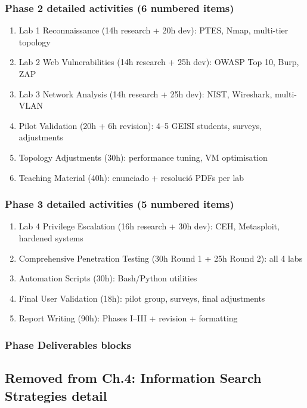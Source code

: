 \documentclass[a4paper,11pt]{article}
\begin{document}
\subsubsection{Phase 2 detailed activities (6 numbered items)}
\begin{enumerate}
\item Lab 1 Reconnaissance (14h research + 20h dev): PTES, Nmap, multi-tier topology
\item Lab 2 Web Vulnerabilities (14h research + 25h dev): OWASP Top 10, Burp, ZAP
\item Lab 3 Network Analysis (14h research + 25h dev): NIST, Wireshark, multi-VLAN
\item Pilot Validation (20h + 6h revision): 4--5 GEISI students, surveys, adjustments
\item Topology Adjustments (30h): performance tuning, VM optimisation
\item Teaching Material (40h): enunciado + resolució PDFs per lab
\end{enumerate}

\subsubsection{Phase 3 detailed activities (5 numbered items)}
\begin{enumerate}
\item Lab 4 Privilege Escalation (16h research + 30h dev): CEH, Metasploit, hardened systems
\item Comprehensive Penetration Testing (30h Round 1 + 25h Round 2): all 4 labs
\item Automation Scripts (30h): Bash/Python utilities
\item Final User Validation (18h): pilot group, surveys, final adjustments
\item Report Writing (90h): Phases I--III + revision + formatting
\end{enumerate}

\subsubsection{Phase Deliverables blocks}

\subsection{Removed from Ch.4: Information Search Strategies detail}
\end{document}
